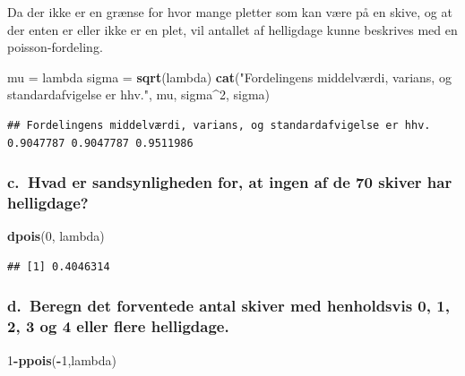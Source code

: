 \documentclass[
]{article}
\newenvironment{Shaded}{\begin{snugshade}}{\end{snugshade}}
\newcommand{\DecValTok}[1]{\textcolor[rgb]{0.00,0.00,0.81}{#1}}
\newcommand{\FunctionTok}[1]{\textcolor[rgb]{0.13,0.29,0.53}{\textbf{#1}}}
\newcommand{\NormalTok}[1]{#1}
\newcommand{\OtherTok}[1]{\textcolor[rgb]{0.56,0.35,0.01}{#1}}
\newcommand{\SpecialCharTok}[1]{\textcolor[rgb]{0.81,0.36,0.00}{\textbf{#1}}}
\newcommand{\StringTok}[1]{\textcolor[rgb]{0.31,0.60,0.02}{#1}}
\begin{document}
Da der ikke er en grænse for hvor mange pletter som kan være på en
skive, og at der enten er eller ikke er en plet, vil antallet af
helligdage kunne beskrives med en poisson-fordeling.

\begin{Shaded}
\begin{Highlighting}[]
\NormalTok{mu }\OtherTok{=}\NormalTok{ lambda}
\NormalTok{sigma }\OtherTok{=} \FunctionTok{sqrt}\NormalTok{(lambda)}
\FunctionTok{cat}\NormalTok{(}\StringTok{"Fordelingens middelværdi, varians, og standardafvigelse er hhv."}\NormalTok{, mu, sigma}\SpecialCharTok{\^{}}\DecValTok{2}\NormalTok{, sigma)}
\end{Highlighting}
\end{Shaded}

\begin{verbatim}
## Fordelingens middelværdi, varians, og standardafvigelse er hhv. 0.9047787 0.9047787 0.9511986
\end{verbatim}

\subsubsection{c.~Hvad er sandsynligheden for, at ingen af de 70 skiver
har
helligdage?}\label{c.-hvad-er-sandsynligheden-for-at-ingen-af-de-70-skiver-har-helligdage}

\begin{Shaded}
\begin{Highlighting}[]
\FunctionTok{dpois}\NormalTok{(}\DecValTok{0}\NormalTok{, lambda)}
\end{Highlighting}
\end{Shaded}

\begin{verbatim}
## [1] 0.4046314
\end{verbatim}

\subsubsection{d.~Beregn det forventede antal skiver med henholdsvis 0,
1, 2, 3 og 4 eller flere
helligdage.}\label{d.-beregn-det-forventede-antal-skiver-med-henholdsvis-0-1-2-3-og-4-eller-flere-helligdage.}

\begin{Shaded}
\begin{Highlighting}[]
\DecValTok{1}\SpecialCharTok{{-}}\FunctionTok{ppois}\NormalTok{(}\SpecialCharTok{{-}}\DecValTok{1}\NormalTok{,lambda)}
\end{Highlighting}
\end{Shaded}
\end{document}
